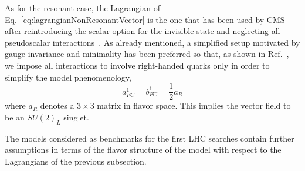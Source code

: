 
As for the resonant case, the Lagrangian of Eq.~\eqref{eq:lagrangianNonResonantVector} is the one that
has been used by CMS after reintroducing the scalar option for the invisible
state and neglecting all pseudoscalar interactions~\cite{CMSmonotop}. As
already mentioned, a simplified setup motivated by gauge invariance and
minimality has been preferred so that, as shown in Ref.~\cite{Boucheneb:2014wza}, we
impose all interactions to involve right-handed quarks only in order to simplify the model phenomenology,
\begin{equation}
a^1_{FC} = b^1_{FC} = \frac12 a_R
\end{equation}
where $a_R$ denotes a $3\times 3$ matrix in flavor space.
This implies the vector field to be an $SU(2)_L$
singlet.

 
The models considered as benchmarks for the first LHC searches
contain further assumptions in terms of the flavor structure of the model
with respect to the Lagrangians of the previous subsection.


